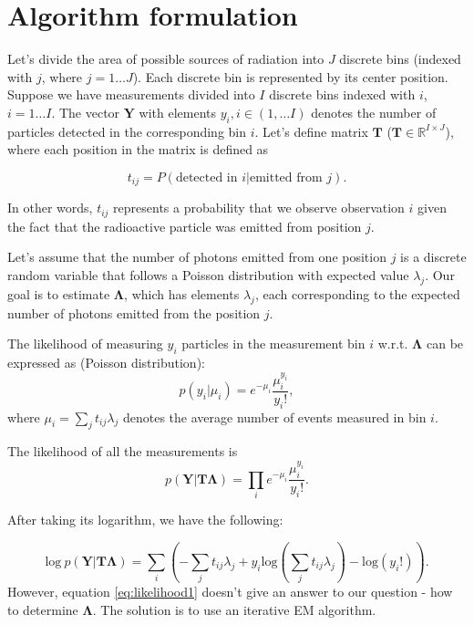 \section{Algorithm formulation}
Let's divide the area of possible sources of radiation into $J$ discrete bins (indexed with $j$, where $j = 1 \dotsc J$).
Each discrete bin is represented by its center position.
Suppose we have measurements divided into $I$ discrete bins indexed with $i$, $i = 1 \dotsc I$.
The vector $\mathbf{Y}$ with elements $y_{i}, i \in (1, \dots I)$ denotes the number of particles detected in the corresponding bin $i$.
Let's define matrix $\mathbf{T}$ ($\mathbf{T} \in \mathbb{R}^{I \times J}$), where each position in the matrix is defined as

\begin{equation}
  t_{ij} =  P(\textrm{detected in } i | \textrm{emitted from } j).
\end{equation}

In other words, $t_{ij}$ represents a probability that we observe observation $i$ given the fact that the radioactive particle was emitted from position $j$.

Let's assume that the number of photons emitted from one position $j$ is a discrete random variable that follows a Poisson distribution with expected value $\lambda_{j}$.
Our goal is to estimate $\mathbf{\Lambda}$, which has elements $\lambda_{j}$, each corresponding to the expected number of photons emitted from the position $j$.

The likelihood of measuring $y_{i}$ particles in the measurement bin $i$ w.r.t. $\mathbf{\Lambda}$ can be expressed as (Poisson distribution):
\begin{equation}
  p(y_{i} |\mu_{i} ) = e^{-\mu_{i}} \frac{\mu_{i}^{y_i}}{y_{i}!},
\end{equation}
where $\mu_{i} = \sum_{j} t_{ij}\lambda_{j}$ denotes the average number of events measured in bin $i$.

The likelihood of all the measurements is
\begin{equation}  
  p(\mathbf{Y} | \mathbf{T\Lambda} ) = \prod_{i} e^{-\mu_{i}} \frac{\mu_{i}^{y_i}}{y_{i}!}.
\end{equation}

After taking its logarithm, we have the following:

\begin{equation}  
  \mathrm{log}\ p(\mathbf{Y} | \mathbf{T\Lambda} ) = \sum_{i}\left ( -\sum_{j} t_{ij}\lambda_{j} + y_{i} \mathrm{log}(\sum_{j} t_{ij}\lambda_{j})  - \mathrm{log}(y_{i}!) \right ).
  \label{eq:likelihood1}
\end{equation}
However, equation \ref{eq:likelihood1} doesn't give an answer to our question - how to determine $\mathbf{\Lambda}$. The solution is to use an iterative \ac{EM} algorithm.

